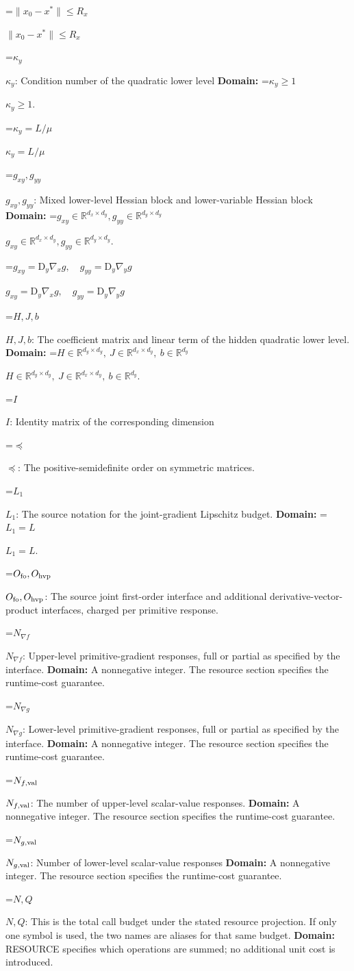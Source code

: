 \documentclass[10pt,a4paper]{article}
\newcommand{\AtlasMath}[1]{\par\begingroup\centering\setbox0=\hbox{$\displaystyle #1$}\ifdim\wd0>1.4\linewidth\typeout{ATLAS WIDE FORMULA: \the\wd0}\fi\ifdim\wd0>\linewidth\resizebox{\linewidth}{!}{\box0}\else\box0\fi\par\endgroup}
\newcommand{\AtlasInlineMath}[1]{\begingroup\setbox0=\hbox{$#1$}\ifdim\wd0>.4\linewidth\endgroup\AtlasMath{#1}\else\endgroup$#1$\fi}
\begin{document}
\AtlasInlineMath{\|x_0-x^*\|\le R_x}

\AtlasInlineMath{\kappa_y}: Condition number of the quadratic lower level \textbf{Domain:} \AtlasInlineMath{\kappa_y\ge1}.

\AtlasInlineMath{\kappa_y=L/\mu}

\AtlasInlineMath{g_{xy},g_{yy}}: Mixed lower-level Hessian block and lower-variable Hessian block \textbf{Domain:} \AtlasInlineMath{g_{xy}\in\mathbb R^{d_x\times d_y},g_{yy}\in\mathbb R^{d_y\times d_y}}.

\AtlasInlineMath{g_{xy}=\mathrm D_y\nabla_xg,\quad g_{yy}=\mathrm D_y\nabla_yg}

\AtlasInlineMath{H,J,b}: The coefficient matrix and linear term of the hidden quadratic lower level. \textbf{Domain:} \AtlasInlineMath{H\in\mathbb R^{d_y\times d_y},\ J\in\mathbb R^{d_x\times d_y},\ b\in\mathbb R^{d_y}}.

\AtlasInlineMath{I}: Identity matrix of the corresponding dimension

\AtlasInlineMath{\preceq}: The positive-semidefinite order on symmetric matrices.

\AtlasInlineMath{L_1}: The source notation for the joint-gradient Lipschitz budget. \textbf{Domain:} \AtlasInlineMath{L_1=L}.

\AtlasInlineMath{O_{\rm fo},O_{\rm hvp}}: The source joint first-order interface and additional derivative-vector-product interfaces, charged per primitive response.

\AtlasInlineMath{N_{\nabla f}}: Upper-level primitive-gradient responses, full or partial as specified by the interface. \textbf{Domain:} A nonnegative integer. The resource section specifies the runtime-cost guarantee.

\AtlasInlineMath{N_{\nabla g}}: Lower-level primitive-gradient responses, full or partial as specified by the interface. \textbf{Domain:} A nonnegative integer. The resource section specifies the runtime-cost guarantee.

\AtlasInlineMath{N_{f,\rm val}}: The number of upper-level scalar-value responses. \textbf{Domain:} A nonnegative integer. The resource section specifies the runtime-cost guarantee.

\AtlasInlineMath{N_{g,\rm val}}: Number of lower-level scalar-value responses \textbf{Domain:} A nonnegative integer. The resource section specifies the runtime-cost guarantee.

\AtlasInlineMath{N,Q}: This is the total call budget under the stated resource projection. If only one symbol is used, the two names are aliases for that same budget. \textbf{Domain:} RESOURCE specifies which operations are summed; no additional unit cost is introduced.
\end{document}
